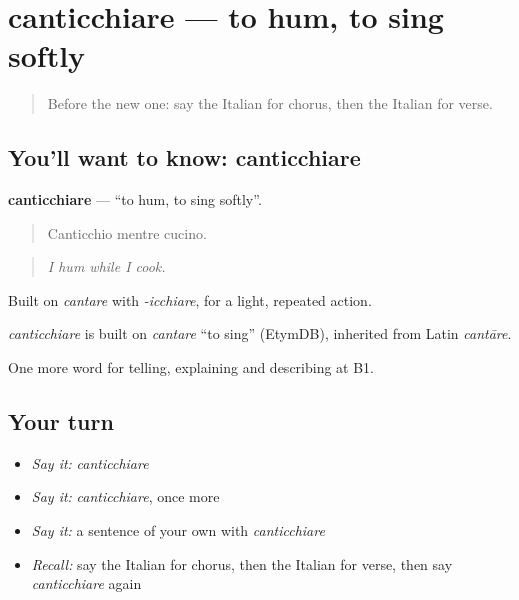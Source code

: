 \section[canticchiare]{canticchiare — to hum, to sing softly}

\label{lesson:IT-C518-canticchiare}



\begin{quote}
Before the new one: say the Italian for chorus, then the Italian for verse.
\end{quote}

\subsection*{You'll want to know: canticchiare}
\textbf{canticchiare} — \textquotedblleft{}to hum, to sing softly\textquotedblright{}.

\begin{quote}
Canticchio mentre cucino.
\end{quote}

\begin{quote}
\emph{I hum while I cook.}
\end{quote}

Built on \emph{cantare} with \emph{-icchiare}, for a light, repeated action.

\begin{cousinweb}
\emph{canticchiare} is built on \emph{cantare} \textquotedblleft{}to sing\textquotedblright{} (EtymDB), inherited from Latin \emph{cantāre}.
\end{cousinweb}

\begin{grammarlens}[title={What you've built}]
One more word for telling, explaining and describing at B1.
\end{grammarlens}

\subsection*{Your turn}
\begin{itemize}
\raggedright
  \item \emph{Say it:} \emph{canticchiare}
  \item \emph{Say it:} \emph{canticchiare}, once more
  \item \emph{Say it:} a sentence of your own with \emph{canticchiare}
  \item \emph{Recall:} say the Italian for chorus, then the Italian for verse, then say \emph{canticchiare} again
\end{itemize}

